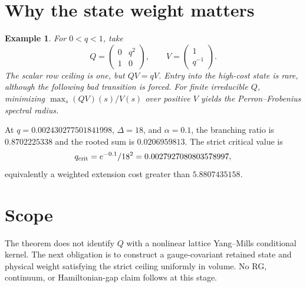 \documentclass[11pt]{article}
\newtheorem{example}{Example}
\begin{document}
\section{Why the state weight matters}
\begin{example}
For $0<q<1$, take
\[
 Q=\begin{pmatrix}0&q^2\\1&0\end{pmatrix},\qquad
 V=\begin{pmatrix}1\\q^{-1}\end{pmatrix}.
\]
The scalar row ceiling is one, but $QV=qV$.  Entry into the high-cost state is
rare, although the following bad transition is forced.  For finite irreducible
$Q$, minimizing $\max_s(QV)(s)/V(s)$ over positive $V$ yields the
Perron--Frobenius spectral radius.
\end{example}

At $q=0.002430277501841998$, $\Delta=18$, and $\alpha=0.1$, the branching
ratio is $0.8702225338$ and the rooted sum is $0.0206959813$.  The strict
critical value is
\[
 q_{\rm crit}=e^{-0.1}/18^2=0.0027927080803578997,
\]
equivalently a weighted extension cost greater than $5.8807435158$.

\section{Scope}
The theorem does not identify $Q$ with a nonlinear lattice Yang--Mills
conditional kernel.  The next obligation is to construct a gauge-covariant
retained state and physical weight satisfying the strict ceiling uniformly in
volume.  No RG, continuum, or Hamiltonian-gap claim follows at this stage.
\end{document}
